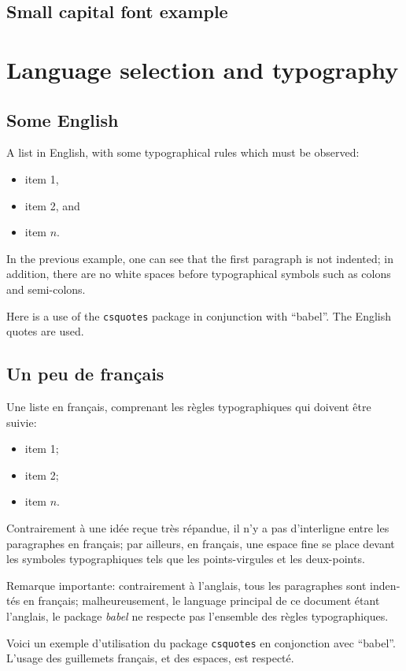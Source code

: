\documentclass[11pt, a4paper, english]{report}
\begin{document}
	\textbf{\textit{\lipsum[1]}}
	
	
	\section{Small capital font example}
	
	\textsc{\lipsum[1]}
	

\chapter{Language selection and typography}

	
	\section{Some English}
	
		A list in English, with some typographical rules which must be observed:
		\begin{itemize}
			\item item 1,
			\item item 2, and
			\item item $n$.
		\end{itemize}
	
		In the previous example, one can see that the first paragraph is not indented; in addition, there are no white spaces before typographical symbols such as colons and semi-colons.
		
		Here is a use of the \texttt{csquotes} package in conjunction with \enquote{babel}. The English quotes are used. 


	\begin{otherlanguage}{french}%
	\section{Un peu de français}
	
		Une liste en français, comprenant les règles typographiques qui doivent être suivie:
		\begin{itemize}
			\item item 1;
			\item item 2;
			\item item $n$.
		\end{itemize}
		
		Contrairement à une idée reçue très répandue, il n'y a pas d'interligne entre les paragraphes en français; par ailleurs, en français, une espace fine se place devant les symboles typographiques tels que les points-virgules et les deux-points.
		
		Remarque importante: contrairement à l'anglais, tous les paragraphes sont indentés en français; malheureusement, le language principal de ce document étant l'anglais, le package \textit{babel} ne respecte pas l'ensemble des règles typographiques.
		
		Voici un exemple d'utilisation du package \texttt{csquotes} en conjonction avec \enquote{babel}. L'usage des guillemets français, et des espaces, est respecté.
	\end{otherlanguage}
		

	
	
\end{document}
